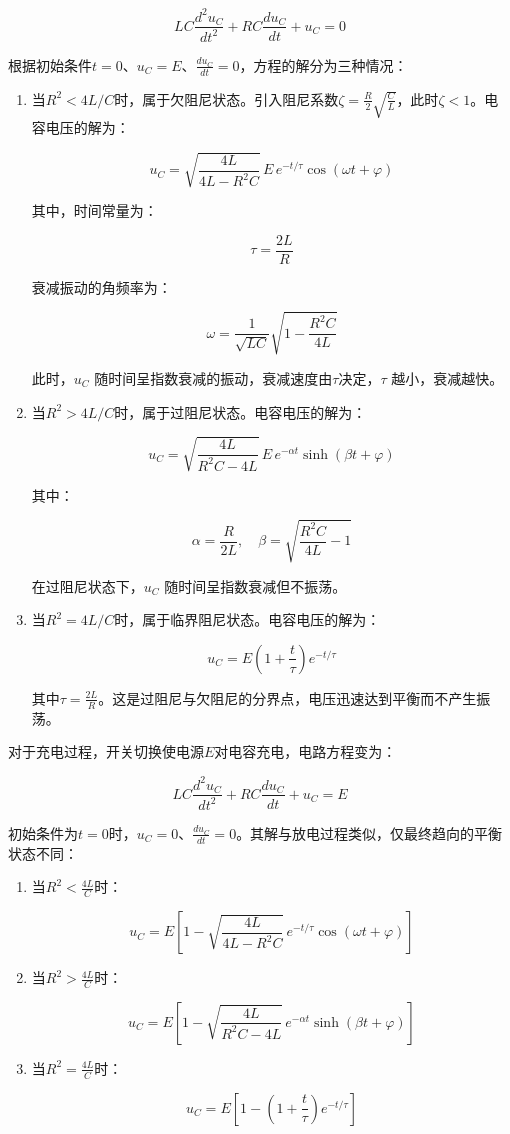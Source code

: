 \documentclass[zihao=5, UTF8]{article}
\theoremstyle{MyLineTheoremStyle} %
\theoremstyle{MyBlockTheoremStyle} %
\theoremstyle{MySubsubsectionStyle} %
\begin{document}
\[
LC \frac{d^2u_C}{dt^2} + RC \frac{du_C}{dt} + u_C = 0
\]

根据初始条件\( t = 0 \)、\( u_C = E \)、\( \frac{du_C}{dt} = 0 \)，方程的解分为三种情况：

\begin{enumerate}
    \item 当\( R^2 < 4L/C \)时，属于欠阻尼状态。引入阻尼系数\( \zeta = \frac{R}{2} \sqrt{\frac{C}{L}} \)，此时\( \zeta < 1 \)。电容电压的解为：

    \[
    u_C = \sqrt{\frac{4L}{4L - R^2C}} \, E \, e^{-t/\tau} \cos(\omega t + \varphi)
    \]

    其中，时间常量为：

    \[
    \tau = \frac{2L}{R}
    \]

    衰减振动的角频率为：

    \[
    \omega = \frac{1}{\sqrt{LC}} \sqrt{1 - \frac{R^2C}{4L}}
    \]

    此时，\( u_C \) 随时间呈指数衰减的振动，衰减速度由\( \tau \)决定，\( \tau \) 越小，衰减越快。

    \item 当\( R^2 > 4L/C \)时，属于过阻尼状态。电容电压的解为：

    \[
    u_C = \sqrt{\frac{4L}{R^2C - 4L}} \, E \, e^{-\alpha t} \sinh(\beta t + \varphi)
    \]

    其中：

    \[
    \alpha = \frac{R}{2L}, \quad \beta = \sqrt{\frac{R^2C}{4L} - 1}
    \]

    在过阻尼状态下，\( u_C \) 随时间呈指数衰减但不振荡。

    \item 当\( R^2 = 4L/C \)时，属于临界阻尼状态。电容电压的解为：

    \[
    u_C = E \left(1 + \frac{t}{\tau}\right) e^{-t/\tau}
    \]

    其中\( \tau = \frac{2L}{R} \)。这是过阻尼与欠阻尼的分界点，电压迅速达到平衡而不产生振荡。
\end{enumerate}

对于充电过程，开关切换使电源\( E \)对电容充电，电路方程变为：

\[
LC \frac{d^2u_C}{dt^2} + RC \frac{du_C}{dt} + u_C = E
\]

初始条件为\( t = 0 \)时，\( u_C = 0 \)、\( \frac{du_C}{dt} = 0 \)。其解与放电过程类似，仅最终趋向的平衡状态不同：

\begin{enumerate}
    \item 当\( R^2 < \frac{4L}{C} \)时：

    \[
    u_C = E \left[1 - \sqrt{\frac{4L}{4L - R^2C}} \, e^{-t/\tau} \cos(\omega t + \varphi)\right]
    \]

    \item 当\( R^2 > \frac{4L}{C} \)时：

    \[
    u_C = E \left[1 - \sqrt{\frac{4L}{R^2C - 4L}} \, e^{-\alpha t} \sinh(\beta t + \varphi)\right]
    \]

    \item 当\( R^2 = \frac{4L}{C} \)时：

    \[
    u_C = E \left[1 - \left(1 + \frac{t}{\tau}\right) e^{-t/\tau}\right]
    \]
\end{enumerate}
\end{document}
